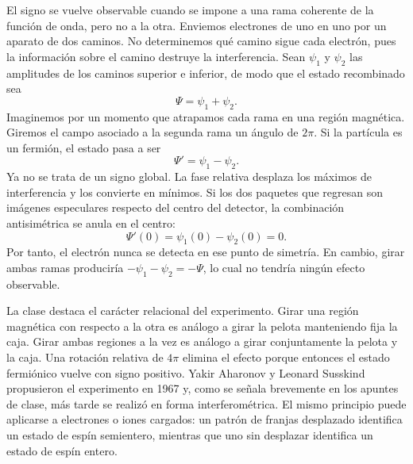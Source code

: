 El signo se vuelve observable cuando se impone a una rama coherente de la función de onda, pero no a la otra. Enviemos electrones de uno en uno por un aparato de dos caminos. No determinemos qué camino sigue cada electrón, pues la información sobre el camino destruye la interferencia. Sean \(\psi_1\) y \(\psi_2\) las amplitudes de los caminos superior e inferior, de modo que el estado recombinado sea
\begin{equation}
\Psi=\psi_1+\psi_2.
\end{equation}
Imaginemos por un momento que atrapamos cada rama en una región magnética. Giremos el campo asociado a la segunda rama un ángulo de \(2\pi\). Si la partícula es un fermión, el estado pasa a ser
\begin{equation}
\Psi'=\psi_1-\psi_2.
\end{equation}
Ya no se trata de un signo global. La fase relativa desplaza los máximos de interferencia y los convierte en mínimos. Si los dos paquetes que regresan son imágenes especulares respecto del centro del detector, la combinación antisimétrica se anula en el centro:
\begin{equation}
\Psi'(0)=\psi_1(0)-\psi_2(0)=0.
\end{equation}
Por tanto, el electrón nunca se detecta en ese punto de simetría. En cambio, girar ambas ramas produciría \(-\psi_1-\psi_2=-\Psi\), lo cual no tendría ningún efecto observable.

La clase destaca el carácter relacional del experimento. Girar una región magnética con respecto a la otra es análogo a girar la pelota manteniendo fija la caja. Girar ambas regiones a la vez es análogo a girar conjuntamente la pelota y la caja. Una rotación relativa de \(4\pi\) elimina el efecto porque entonces el estado fermiónico vuelve con signo positivo. Yakir Aharonov y Leonard Susskind propusieron el experimento en 1967 y, como se señala brevemente en los apuntes de clase, más tarde se realizó en forma interferométrica. El mismo principio puede aplicarse a electrones o iones cargados: un patrón de franjas desplazado identifica un estado de espín semientero, mientras que uno sin desplazar identifica un estado de espín entero.

\begin{classroomqa}\end{classroomqa}

